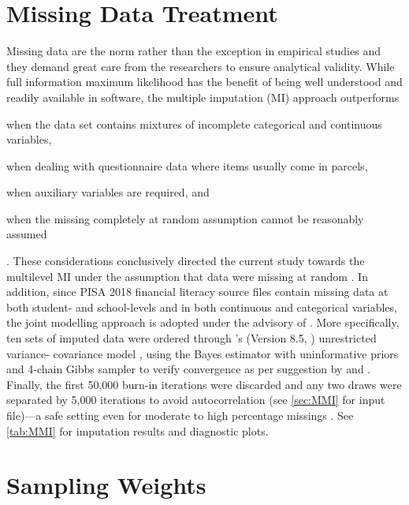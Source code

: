 

\section{Missing Data Treatment}

Missing data are the norm rather than the exception in empirical studies and they demand great care from the researchers to ensure analytical validity. While full information maximum likelihood has the benefit of being well understood and readily available in software, the multiple imputation (MI) approach outperforms
\begin{enumerate*}[label={(\alph*)}]
    \item when the data set contains mixtures of incomplete categorical and continuous variables,
    \item when dealing with questionnaire data where items usually come in parcels,
    \item when auxiliary variables are required, and
    \item when the missing completely at random assumption cannot be reasonably assumed
\end{enumerate*}
\parencite{enders:2018}. These considerations conclusively directed the current study towards the multilevel MI under the assumption that data were missing at random \parencite{little:2019}. In addition, since PISA 2018 financial literacy source files contain missing data at both student- and school-levels and in both continuous and categorical variables, the joint modelling approach is adopted under the advisory of \textcite{grund:2018}. More specifically, ten sets of imputed data were ordered through \CM's (Version 8.5, \textcite{mplus}) unrestricted variance- covariance model \parencite[``JM-AM H1'',][]{asparouhov:2010b}, using the Bayes estimator with uninformative priors and 4-chain Gibbs sampler to verify convergence as per suggestion by \textcite[][p. 230]{little:2019} and \textcite[][p. 314]{lambert:2018}. Finally, the first 50,000 burn-in iterations were discarded and any two draws were separated by 5,000 iterations to avoid autocorrelation (see \cref{sec:MMI} for input file)---a safe setting even for moderate to high percentage missings \parencite{grund:2016}. See \cref{tab:MMI} for imputation results and diagnostic plots.

\section{Sampling Weights}

